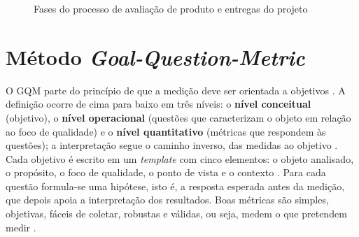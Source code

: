 \begin{figure}[htb]
	\centering
	\caption{Fases do processo de avaliação de produto e entregas do projeto}
	\label{fig:processo}
\end{figure}

\section{Método \textit{Goal-Question-Metric}}
\label{sec:gqm}

O GQM parte do princípio de que a medição deve ser orientada a objetivos \cite{basili1994}. A definição ocorre de cima para baixo em três níveis: o \textbf{nível conceitual} (objetivo), o \textbf{nível operacional} (questões que caracterizam o objeto em relação ao foco de qualidade) e o \textbf{nível quantitativo} (métricas que respondem às questões); a interpretação segue o caminho inverso, das medidas ao objetivo \cite{ramos2026gqm}. Cada objetivo é escrito em um \textit{template} com cinco elementos: o objeto analisado, o propósito, o foco de qualidade, o ponto de vista e o contexto \cite{basili1994}. Para cada questão formula-se uma hipótese, isto é, a resposta esperada antes da medição, que depois apoia a interpretação dos resultados. Boas métricas são simples, objetivas, fáceis de coletar, robustas e válidas, ou seja, medem o que pretendem medir \cite{ramos2026gqm}.

